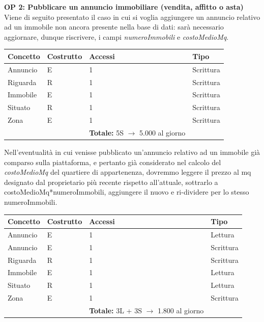 \documentclass[a4paper,12pt]{report}
\begin{document}
            \noindent
            \textbf{OP 2: Pubblicare un annuncio immobiliare (vendita, affitto o asta)}
            Viene di seguito presentato il caso in cui si voglia aggiungere un annuncio relativo ad un immobile
            non ancora presente nella base di dati: sarà necessario aggiornare, dunque riscrivere, i campi 
            \textit{numeroImmobili} e \textit{costoMedioMq}.
        	\begin{table}[H]
            \centering
             \begin{tabular}{llll}
             \rowcolor{yellow!20} \textbf{Concetto} & \textbf{Costrutto} & \textbf{Accessi} & \textbf{Tipo} \\ [0.5ex] 
             \hline
             Annuncio & E & 1 & Scrittura \\ 
             Riguarda & R & 1 & Scrittura \\ 
             Immobile & E & 1 & Scrittura \\ 
             Situato & R & 1 & Scrittura \\ 
             Zona & E & 1 & Scrittura \\ 
             \hline
             \rowcolor{yellow!20}  \rowcolor{yellow!20} &   & \textbf{Totale:} 5S $\rightarrow$ 5.000 al giorno &  \\ [1ex] 
             \end{tabular}
            \end{table} 
            \noindent
            Nell'eventualità in cui venisse pubblicato un'annuncio relativo ad un immobile già comparso sulla
            piattaforma, e pertanto già considerato nel calcolo del \textit{costoMedioMq} del quartiere di
            appartenenza, dovremmo leggere il prezzo al mq designato dal proprietario più recente rispetto all'attuale, 
            sottrarlo a costoMedioMq*numeroImmobili, aggiungere il nuovo e ri-dividere per lo stesso numeroImmobili.
            
        	\begin{table}[H]
            \centering
             \begin{tabular}{llll}
             \rowcolor{yellow!20}\rowcolor{yellow!20} \textbf{Concetto} & \textbf{Costrutto} & \textbf{Accessi} & \textbf{Tipo}\\ [0.5ex] 
             \hline
             Annuncio & E & 1 & Lettura \\
             Annuncio & E & 1 & Scrittura \\
             Riguarda & R & 1 & Scrittura \\ 
             Immobile & E & 1 & Lettura \\ 
             Situato & R & 1 & Lettura \\ 
             Zona & E & 1 & Scrittura \\  
             \hline
             \rowcolor{yellow!20} &   & \textbf{Totale:} 3L + 3S $\rightarrow$ 1.800 al giorno &  \\ [1ex] 
             \end{tabular}
            \end{table}
\end{document}
